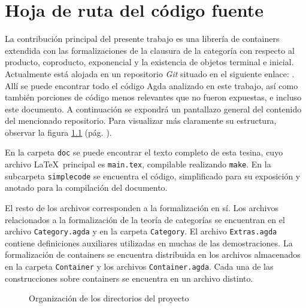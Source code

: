 \chapter{Hoja de ruta del código fuente}\label{guia}

La contribución principal del presente trabajo es una librería de containers extendida con las formalizaciones de la clausura de la categoría con respecto al producto, coproducto, exponencial y la existencia de objetos terminal e inicial. Actualmente está alojada en un repositorio {\it Git} situado en el siguiente enlace: \gitcode. Allí se puede encontrar todo el código Agda analizado en este trabajo, así como también porciones de código menos relevantes que no fueron expuestas, e incluso este documento. A continuación se expondrá un pantallazo general del contenido del mencionado repositorio. Para visualizar más claramente su estructura, observar la figura \ref{fig:map} (pág. \pageref{fig:map}).

En la carpeta \texttt{doc} se puede encontrar el texto completo de esta tesina, cuyo archivo \LaTeX\ principal es \texttt{main.tex}, compilable realizando \texttt{make}. En la subcarpeta \texttt{simplecode} se encuentra el código, simplificado para su exposición y anotado para la compilación del documento.

El resto de los archivos corresponden a la formalización en sí. Los archivos relacionados a la formalización de la teoría de categorías se encuentran en el archivo \texttt{Category.agda} y en la carpeta \texttt{Category}. El archivo \texttt{Extras.agda} contiene definiciones auxiliares utilizadas en muchas de las demostraciones. La formalización de containers se encuentra distribuida en los archivos almacenados en la carpeta \texttt{Container} y los archivos \texttt{Container.agda}.  
Cada una de las construcciones sobre containers se encuentra en un archivo distinto.

\begin{figure}[h]
\caption{Organización de los directorios del proyecto}\label{fig:map}
\end{figure}
